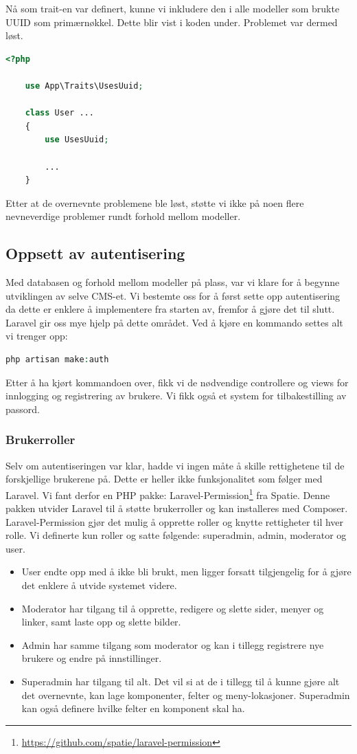 Nå som trait-en var definert, kunne vi inkludere den i alle modeller som brukte UUID som primærnøkkel. Dette blir vist i koden under. Problemet var dermed løst.
\begin{lstlisting}[caption={Bruk av UUID trait i modell}, language=PHP]
    <?php

    use App\Traits\UsesUuid;

    class User ...
    {
        use UsesUuid;

        ...
    }
\end{lstlisting}

Etter at de overnevnte problemene ble løst, støtte vi ikke på noen flere nevneverdige problemer rundt forhold mellom modeller.

\subsection{Oppsett av autentisering}
Med databasen og forhold mellom modeller på plass, var vi klare for å begynne utviklingen av selve CMS-et. Vi bestemte oss for å først sette opp autentisering da dette er enklere å implementere fra starten av, fremfor å gjøre det til slutt.
Laravel gir oss mye hjelp på dette området. Ved å kjøre en kommando settes alt vi trenger opp:
\begin{lstlisting}[language=PHP]
    php artisan make:auth
\end{lstlisting}
Etter å ha kjørt kommandoen over, fikk vi de nødvendige controllere og views for innlogging og registrering av brukere. Vi fikk også et system for tilbakestilling av passord.

\subsubsection{Brukerroller}
Selv om autentiseringen var klar, hadde vi ingen måte å skille rettighetene til de forskjellige brukerene på. Dette er heller ikke funksjonalitet som følger med Laravel. Vi fant derfor en PHP pakke: Laravel-Permission\footnote{\url{https://github.com/spatie/laravel-permission}} fra Spatie. Denne pakken utvider Laravel til å støtte brukerroller og kan installeres med Composer. Laravel-Permission gjør det mulig å opprette roller og knytte rettigheter til hver rolle. Vi definerte kun roller og satte følgende: superadmin, admin, moderator og user.
\begin{itemize}
    \item User endte opp med å ikke bli brukt, men ligger forsatt tilgjengelig for å gjøre det enklere å utvide systemet videre.
    \item Moderator har tilgang til å opprette, redigere og slette sider, menyer og linker, samt laste opp og slette bilder.
    \item Admin har samme tilgang som moderator og kan i tillegg registrere nye brukere og endre på innstillinger.
    \item Superadmin har tilgang til alt. Det vil si at de i tillegg til å kunne gjøre alt det overnevnte, kan lage komponenter, felter og meny-lokasjoner. Superadmin kan også definere hvilke felter en komponent skal ha.
\end{itemize}

